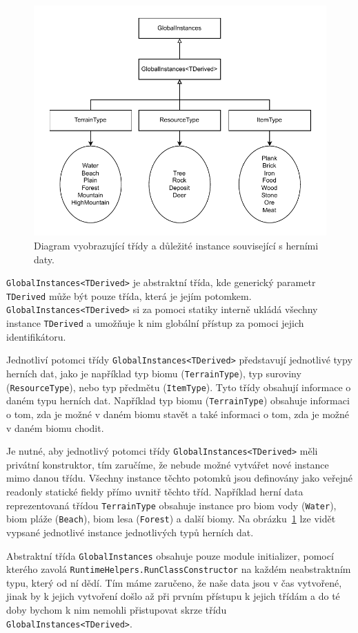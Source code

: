 \begin{figure}[!htb]
  \centering
  \includegraphics[width=0.7\linewidth]{img/game-data.pdf}
  \caption{Diagram vyobrazující třídy a důležité instance související s herními daty.}
  \label{fig:game-data}
\end{figure}

\texttt{GlobalInstances<TDerived>} je abstraktní třída, kde generický parametr \texttt{TDerived} může být pouze třída, která je jejím potomkem. \texttt{GlobalInstances<TDerived>} si za pomoci statiky interně ukládá všechny instance \texttt{TDerived} a umožňuje k nim globální přístup za pomoci jejich identifikátoru.

Jednotliví potomci třídy \texttt{GlobalInstances<TDerived>} představují jednotlivé typy herních dat, jako je například typ biomu (\texttt{TerrainType}), typ suroviny (\texttt{ResourceType}), nebo typ předmětu (\texttt{ItemType}). Tyto třídy obsahují informace o daném typu herních dat. Například typ biomu (\texttt{TerrainType}) obsahuje informaci o tom, zda je možné v daném biomu stavět a také informaci o tom, zda je možné v daném biomu chodit.

Je nutné, aby jednotlivý potomci třídy \texttt{GlobalInstances<TDerived>} měli privátní konstruktor, tím zaručíme, že nebude možné vytvářet nové instance mimo danou třídu. Všechny instance těchto potomků jsou definovány jako veřejné readonly statické fieldy přímo uvnitř těchto tříd.  Například herní data reprezentovaná třídou \texttt{TerrainType} obsahuje instance pro biom vody (\texttt{Water}), biom pláže (\texttt{Beach}), biom lesa (\texttt{Forest}) a další biomy. Na obrázku~\ref{fig:game-data} lze vidět vypsané jednotlivé instance jednotlivých typů herních dat.

Abstraktní třída \texttt{GlobalInstances} obsahuje pouze module initializer, pomocí kterého zavolá \texttt{RuntimeHelpers.RunClassConstructor} na každém neabstraktním typu, který od ní dědí. Tím máme zaručeno, že naše data jsou v čas vytvořené, jinak by k jejich vytvoření došlo až při prvním přístupu k jejich třídám a do té doby bychom k nim nemohli přistupovat skrze třídu \texttt{GlobalInstances<TDerived>}.


